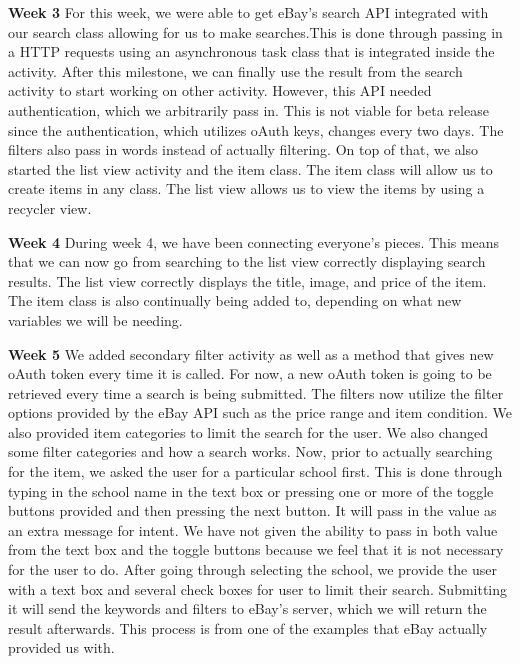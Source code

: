 \documentclass[journal,compsoc, 10pt, draftclsnofoot, onecolumn]{IEEEtran}
\begin{document}
\textbf{Week 3}\newline
For this week, we were able to get eBay's search API integrated with our 
search class allowing for us to make searches.This is done through passing 
in a HTTP requests using an asynchronous task class that is integrated inside the 
activity. After this milestone, we can finally use the result from the search
 activity to start working on other activity. However, this API needed 
authentication, which we arbitrarily pass in. This is not viable for beta release 
since the authentication, which utilizes oAuth keys, changes every two days. 
The filters also pass in words instead of actually filtering. On top of that, we 
also started the list view activity and the item class. The item class will allow us to create 
items in any class. The list view allows us to view the items by using a recycler 
view.\newline

\textbf{Week 4}\newline
During week 4, we have been connecting everyone's pieces. This means that we 
can now go from searching to the list view correctly displaying search results. 
The list view correctly displays the title, image, and price of the item. The 
item class is also continually being added to, depending on what new variables
we will be needing. \newline

\textbf{Week 5}\newline
 We added secondary filter activity as well as a method that gives new oAuth 
token every time it is called. For now, a new oAuth token is going to be 
retrieved every time a search is being submitted. The filters now utilize the 
filter options provided by the eBay API such as the price range and item 
condition. We also provided item categories to limit the search for the user. 
We also changed some filter categories and how a search works. Now, 
prior to actually searching for the item, we asked the user for a particular 
school first. This is done through typing in the school name in the text box 
or pressing one or more of the toggle buttons provided and then pressing the 
next button. It will pass in the value as an extra message for intent. We have 
not given the ability to pass in both value from the text box and the toggle 
buttons because we feel that it is not necessary for the user to do. After 
going through selecting the school, we provide the user with a text box and 
several check boxes for user to limit their search. Submitting it will send the
 keywords and filters to eBay's server, which we will return the result afterwards. 
This process is from one of the examples that eBay actually provided us with. 
\end{document}
